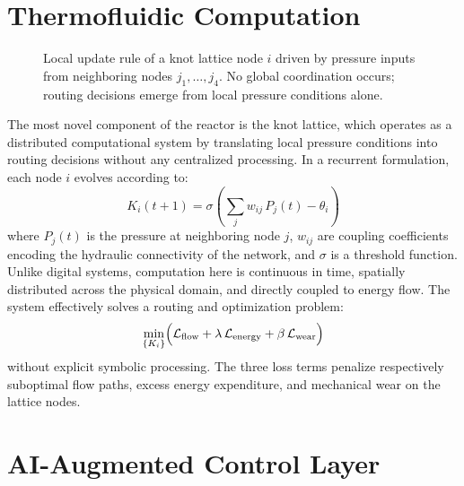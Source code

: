 \documentclass[12pt, a4paper]{article}
\begin{document}
\section{Thermofluidic Computation}


\begin{figure}[h]
\centering
{}
\caption{Local update rule of a knot lattice node $i$ driven by pressure inputs from neighboring nodes $j_1,\ldots,j_4$. No global coordination occurs; routing decisions emerge from local pressure conditions alone.}
\end{figure}

The most novel component of the reactor is the knot lattice, which operates as a distributed computational system by translating local pressure conditions into routing decisions without any centralized processing. In a recurrent formulation, each node $i$ evolves according to:
\[
K_i(t+1) = \sigma \!\left( \sum_j w_{ij}\, P_j(t) - \theta_i \right)
\]
where $P_j(t)$ is the pressure at neighboring node $j$, $w_{ij}$ are coupling coefficients encoding the hydraulic connectivity of the network, and $\sigma$ is a threshold function. Unlike digital systems, computation here is continuous in time, spatially distributed across the physical domain, and directly coupled to energy flow. The system effectively solves a routing and optimization problem:
\[
\min_{\{K_i\}} \Bigl( \mathcal{L}_{\text{flow}} + \lambda\, \mathcal{L}_{\text{energy}} + \beta\, \mathcal{L}_{\text{wear}} \Bigr)
\]
without explicit symbolic processing. The three loss terms penalize respectively suboptimal flow paths, excess energy expenditure, and mechanical wear on the lattice nodes.

\section{AI-Augmented Control Layer}
\end{document}
